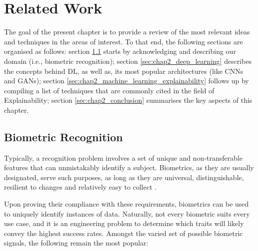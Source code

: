 \chapter{Related Work}
\label{chap2:related_work}

The goal of the present chapter is to provide a review of the most relevant ideas and techniques in the areas of interest. To that end, the following sections are organised as follows: section \ref{sec:chap2_biometric_recognition} starts by acknowledging and describing our domain (i.e., biometric recognition); section \ref{sec:chap2_deep_learning} describes the concepts behind \ac{DL}, as well as, its most popular architectures (like \ac{CNN}s and \ac{GAN}s); section \ref{sec:chap2_machine_learning_explainability} follows up by compiling a list of techniques that are commonly cited in the field of Explainability; section \ref{sec:chap2_conclusion} summarises the key aspects of this chapter.

\section{Biometric Recognition}
\label{sec:chap2_biometric_recognition}

Typically, a recognition problem involves a set of unique and non-transferable features that can unmistakably identify a subject. Biometrics, as they are usually designated, serve such purposes, as long as they are universal, distinguishable, resilient to changes and relatively easy to collect \cite{introduction_to_biometric_recognition}. 

Upon proving their compliance with these requirements, biometrics can be used to uniquely identify instances of data. 
Naturally, not every biometric suits every use case, and it is an engineering problem to determine which traits will likely convey the highest success rates. Amongst the varied set of possible biometric signals, the following remain the most popular:

